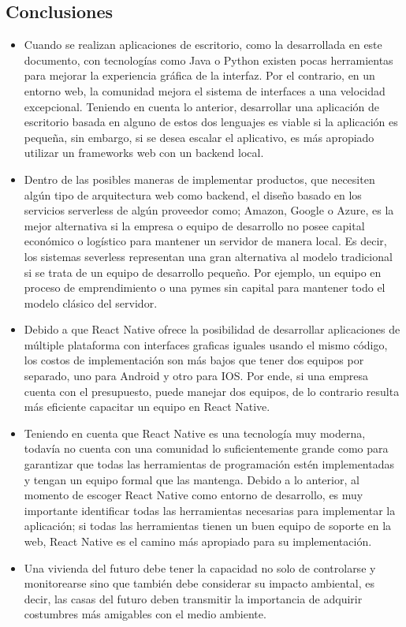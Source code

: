 	

\subsection{Conclusiones}
\begin{itemize}
	
	\item Cuando se realizan aplicaciones de escritorio, como la desarrollada en este documento, con tecnologías como Java o Python existen pocas herramientas para mejorar la experiencia gráfica de la interfaz. Por el contrario, en un entorno web, la comunidad mejora el sistema de interfaces a una velocidad excepcional. Teniendo en cuenta lo anterior, desarrollar una aplicación de escritorio basada en alguno de estos dos lenguajes es viable si la aplicación es pequeña, sin embargo, si se desea escalar el aplicativo, es más apropiado utilizar un frameworks web con un backend local.
	
	\item Dentro de las posibles maneras de implementar productos, que necesiten algún tipo de arquitectura web como backend, el diseño basado en los servicios serverless de algún proveedor como; Amazon, Google o Azure, es la mejor alternativa si la empresa o equipo de desarrollo no posee capital económico o logístico para mantener un servidor de manera local. Es decir, los sistemas severless representan una gran alternativa al modelo tradicional si se trata de un equipo de desarrollo pequeño. Por ejemplo, un equipo en proceso de emprendimiento o una pymes sin capital para mantener todo el modelo clásico del servidor.
	
	\item Debido a que React Native ofrece la posibilidad de desarrollar aplicaciones de múltiple plataforma con interfaces graficas iguales usando el mismo código, los costos de implementación son más bajos que tener dos equipos por separado, uno para Android y otro para IOS. Por ende, si una empresa cuenta con el presupuesto, puede manejar dos equipos, de lo contrario resulta más eficiente capacitar un equipo en React Native.
	
	\item Teniendo en cuenta que React Native es una tecnología muy moderna, todavía no cuenta con una comunidad lo suficientemente grande como para garantizar que todas las herramientas de programación estén implementadas y tengan un equipo formal que las mantenga. Debido a lo anterior, al momento de escoger React Native como entorno de desarrollo, es muy importante identificar todas las herramientas necesarias para implementar la aplicación; si todas las herramientas tienen un buen equipo de soporte en la web, React Native es el camino más apropiado para su implementación.
	
	\item Una vivienda del futuro debe tener la capacidad no solo de controlarse y monitorearse sino que también debe considerar su impacto ambiental, es decir, las casas del futuro deben transmitir la importancia de adquirir costumbres más amigables con el medio ambiente.
	
\end{itemize}

